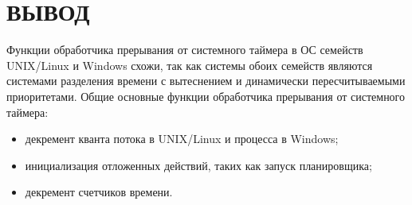 \chapter*{ВЫВОД}

Функции обработчика прерывания от системного таймера в ОС семейств UNIX/Linux и Windows схожи, так как системы обоих семейств являются системами разделения времени с вытеснением и динамически пересчитываемыми приоритетами.
Общие основные функции обработчика прерывания от системного таймера:
\begin{itemize}
	\item декремент кванта потока в UNIX/Linux и процесса в Windows;
	\item инициализация отложенных действий, таких как запуск планировщика;
	\item декремент счетчиков времени.
\end{itemize}